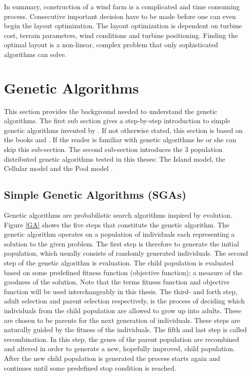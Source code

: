 \noindent In summary, construction of a wind farm is a complicated and time consuming process. Consecutive important decision have to be made before one can even begin the layout optimization. The layout optimization is dependent on turbine cost, terrain parameters, wind conditions and turbine positioning. Finding the optimal layout is a non-linear, complex problem that only sophisticated algorithms can solve.


\section{Genetic Algorithms}\label{section:ga}
This section provides the background needed to understand the genetic algorithms. The first sub section gives a step-by-step introduction to simple genetic algorithms invented by \cite{Holland}. If not otherwise stated, this section is based on the books \cite{Holland} and \cite{Goldberg}. If the reader is familiar with genetic algorithms he or she can skip this sub-section. The second sub-section introduces the 3 population distributed genetic algorithms tested in this theses: The Island model, the Cellular model and the Pool model \citep{Gong}.\\


\subsection{Simple Genetic Algorithms (SGAs)}\label{subsection:sga}
Genetic algorithms are probabilistic search algorithms inspired by evolution. Figure \ref{GA} shows the five steps that constitute the genetic algorithm. The genetic algorithm operates on a population of individuals each representing a solution to the given problem. The first step is therefore to generate the initial population, which usually consists of randomly generated individuals. The second step of the genetic algorithm is evaluation. The child population is evaluated based on some predefined fitness function (objective function); a measure of the goodness of the solution. Note that the terms fitness function and objective function will be used interchangeably in this thesis. The third- and forth step, adult selection and parent selection respectively, is the process of deciding which individuals from the child population are allowed to grow up into adults. These are chosen to be parents for the next generation of individuals. These steps are naturally guided by the fitness of the individuals. The fifth and last step is called recombination. In this step, the genes of the parent population are recombined and altered in order to generate a new, hopefully improved, child population. After the new child population is generated the process starts again and continues until some predefined stop condition is reached. \\


